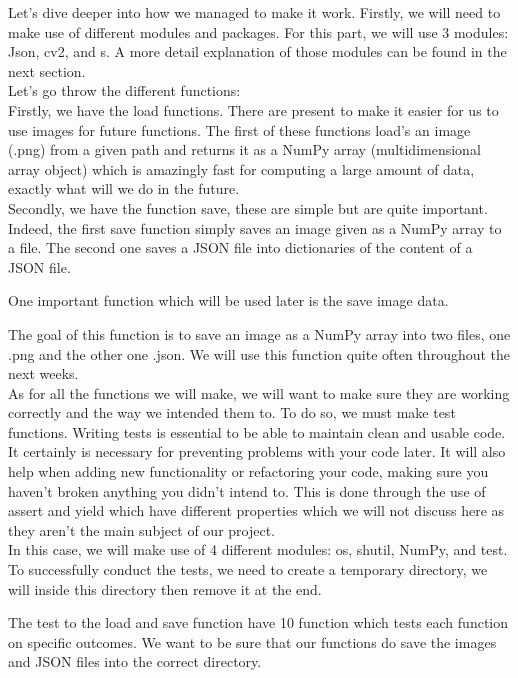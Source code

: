 \documentclass[12pt]{article}
\begin{document}
Let’s dive deeper into how we managed to make it work. Firstly, we will need to make use of different modules and packages. For this part, we will use 3 modules: Json, cv2, and s. A more detail explanation of those modules can be found in the next section.\\ 

 
Let’s go throw the different functions: \\ 

Firstly, we have the load functions. There are present to make it easier for us to use images for future functions. The first of these functions load’s an image (.png) from a given path and returns it as a NumPy array (multidimensional array object) which is amazingly fast for computing a large amount of data, exactly what will we do in the future.\\ 

Secondly, we have the function save, these are simple but are quite important. Indeed, the first save function simply saves an image given as a NumPy array to a file. The second one saves a JSON file into dictionaries of the content of a JSON file. 

One important function which will be used later is the save image data. 

The goal of this function is to save an image as a NumPy array into two files, one .png and the other one .json. We will use this function quite often throughout the next weeks.\\ 

As for all the functions we will make, we will want to make sure they are working correctly and the way we intended them to. To do so, we must make test functions. Writing tests is essential to be able to maintain clean and usable code. It certainly is necessary for preventing problems with your code later. It will also help when adding new functionality or refactoring your code, making sure you haven’t broken anything you didn’t intend to. This is done through the use of assert and yield which have different properties which we will not discuss here as they aren’t the main subject of our project.\\ 

In this case, we will make use of 4 different modules: os, shutil, NumPy, and test. To successfully conduct the tests, we need to create a temporary directory, we will inside this directory then remove it at the end.  

The test to the load and save function have 10 function which tests each function on specific outcomes. We want to be sure that our functions do save the images and JSON files into the correct directory.  
\end{document}
